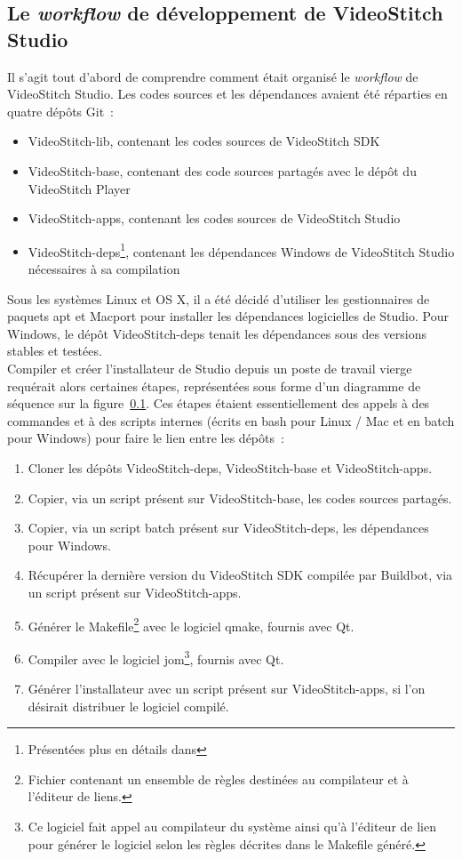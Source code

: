 \subsection{Le \textit{workflow} de développement de VideoStitch Studio}
\label{workflow-studio}
Il s'agit tout d'abord de comprendre comment était organisé le \textit{workflow} 
de VideoStitch Studio.
Les codes sources et les dépendances avaient été réparties en quatre dépôts Git~: 
\begin{itemize}
  \item VideoStitch-lib, contenant les codes sources de VideoStitch SDK
  \item VideoStitch-base, contenant des code sources partagés avec le dépôt du VideoStitch Player
  \item VideoStitch-apps, contenant les codes sources de VideoStitch Studio
  \item VideoStitch-deps\footnote{Présentées plus en détails dans }, 
  contenant les dépendances Windows de VideoStitch Studio 
  nécessaires à sa compilation
\end{itemize}
Sous les systèmes Linux et OS X, il a été décidé d'utiliser les gestionnaires
de paquets apt et Macport pour installer les dépendances logicielles de Studio. Pour
Windows, le dépôt VideoStitch-deps tenait les dépendances sous des versions stables et testées.\\
\newline
Compiler et créer l'installateur de Studio depuis un poste de travail vierge requérait alors
certaines étapes, représentées sous forme d'un diagramme de séquence sur la figure~\ref{workflow-studio}.
Ces étapes étaient essentiellement des appels à des commandes et à des scripts internes
(écrits en bash pour Linux / Mac et en batch pour Windows) pour faire le lien entre les dépôts~:
\begin{enumerate}
  \item Cloner les dépôts VideoStitch-deps, VideoStitch-base et VideoStitch-apps.
  \item Copier, via un script présent sur VideoStitch-base, les codes sources partagés.
  \item Copier, via un script batch présent sur VideoStitch-deps, les dépendances pour Windows.
  \item Récupérer la dernière version du VideoStitch SDK compilée par Buildbot, 
  via un script présent sur VideoStitch-apps.
  \item Générer le Makefile\footnote{Fichier contenant un ensemble de règles destinées
  au compilateur et à l'éditeur de liens.} avec le logiciel qmake, fournis avec Qt.
  \item Compiler avec le logiciel jom\footnote{Ce logiciel fait appel au compilateur 
  du système ainsi qu'à l'éditeur de lien pour générer le logiciel selon les règles
  décrites dans le Makefile généré.}, fournis avec Qt.
  \item Générer l'installateur avec un script présent sur VideoStitch-apps, si
  l'on désirait distribuer le logiciel compilé.
\end{enumerate}
